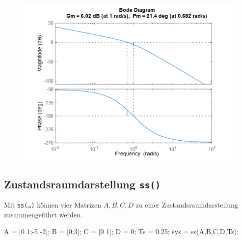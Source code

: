 \documentclass[
  10pt,
  a4paper,
  twocolumn]{article}
\newenvironment{Shaded}{}{}
\newcommand{\FloatTok}[1]{\textcolor[rgb]{0.00,0.36,0.77}{#1}}
\newcommand{\NormalTok}[1]{\textcolor[rgb]{0.14,0.16,0.18}{#1}}
\newcommand{\OperatorTok}[1]{\textcolor[rgb]{0.14,0.16,0.18}{#1}}
\newcommand{\VariableTok}[1]{\textcolor[rgb]{0.89,0.38,0.04}{#1}}
\numberwithin{equation}{section}
\begin{document}
\begin{figure}[H]

{\centering \includegraphics{images/PlotGainAndPhaseMarginsOfTransferFunctionExample_01.png}

}

\end{figure}

\hypertarget{zustandsraumdarstellung-ss}{%
\subsection{\texorpdfstring{Zustandsraumdarstellung
\texttt{ss()}}{Zustandsraumdarstellung ss()}}\label{zustandsraumdarstellung-ss}}

Mit \texttt{ss(…)} können vier Matrizen \(A, B,C,D\) zu einer
Zustandsraumdarstellung zusammengeführt werden.

\begin{Shaded}
\begin{Highlighting}[]
\VariableTok{A} \OperatorTok{=}\NormalTok{ [}\FloatTok{0} \FloatTok{1}\OperatorTok{;{-}}\FloatTok{5} \OperatorTok{{-}}\FloatTok{2}\NormalTok{]}\OperatorTok{;}
\VariableTok{B} \OperatorTok{=}\NormalTok{ [}\FloatTok{0}\OperatorTok{;}\FloatTok{3}\NormalTok{]}\OperatorTok{;}
\VariableTok{C} \OperatorTok{=}\NormalTok{ [}\FloatTok{0} \FloatTok{1}\NormalTok{]}\OperatorTok{;}
\VariableTok{D} \OperatorTok{=} \FloatTok{0}\OperatorTok{;}
\VariableTok{Ts} \OperatorTok{=} \FloatTok{0.25}\OperatorTok{;}
\VariableTok{sys} \OperatorTok{=} \VariableTok{ss}\NormalTok{(}\VariableTok{A}\OperatorTok{,}\VariableTok{B}\OperatorTok{,}\VariableTok{C}\OperatorTok{,}\VariableTok{D}\OperatorTok{,}\VariableTok{Ts}\NormalTok{)}\OperatorTok{;}
\end{Highlighting}
\end{Shaded}
\end{document}
